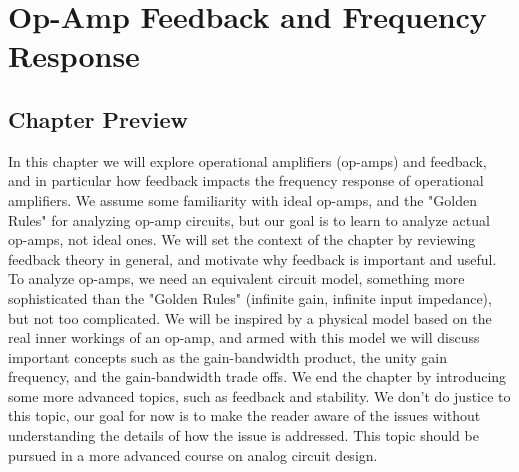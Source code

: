 \chapter{Op-Amp Feedback and Frequency Response}
\label{ch:ch17_opamps_fb}
\graphicspath{{./figs_opamps_fb/}}
\section{Chapter Preview}
In this chapter we will explore operational amplifiers (op-amps) and feedback, and in particular how feedback impacts the frequency response of operational amplifiers.  We assume some familiarity with ideal op-amps, and the "Golden Rules" for analyzing op-amp circuits, but our goal is to learn to analyze actual op-amps, not ideal ones.  We will set the context of the chapter by reviewing feedback theory in general, and motivate why feedback is important and useful.  To analyze op-amps, we need an equivalent circuit model, something more sophisticated than the "Golden Rules" (infinite gain, infinite input impedance), but not too complicated.   We will be inspired by a physical model based on the real inner workings of an op-amp, and armed with this model we will discuss important concepts such as the gain-bandwidth product, the unity gain frequency, and the gain-bandwidth trade offs.  We end the chapter by introducing some more advanced topics, such as feedback and stability.  We don't do justice to this topic, our goal for now is to make the reader aware of the issues without understanding the details of how the issue is addressed.  This topic should be pursued in a more advanced course on analog circuit design. 
